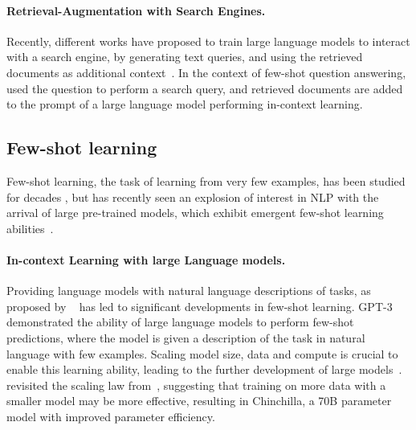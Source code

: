 \documentclass[10pt]{article} \usepackage[preprint]{tmlr}
\begin{document}
\paragraph{Retrieval-Augmentation with Search Engines.}
Recently, different works have proposed to train large language models to interact with a search engine, by generating text queries, and using the retrieved documents as additional context~\citep{Nakano2021WebGPTBQ,Thoppilan2022LaMDALM,Shuster2022LanguageMT}.
In the context of few-shot question answering, \citet{Lazaridou2022InternetaugmentedLM} used the question to perform a search query, and retrieved documents are added to the prompt of a large language model performing in-context learning.

\subsection{Few-shot learning}
Few-shot learning, the task of learning from very few examples, has been studied for decades \citep{thrun_learning,fink_object,matchingnetworks}, but has recently seen an explosion of interest in NLP with the arrival of large pre-trained models, which exhibit emergent few-shot learning abilities~\citep{wei2022emergent}.

\paragraph{In-context Learning with large Language models.}
Providing language models with natural language descriptions of tasks, as proposed by ~\citet{radford2019language} has led to significant developments in few-shot learning.
GPT-3~\citep{brown2020gpt3} demonstrated the ability of large language models to perform few-shot predictions, where the model is given a description of the task in natural language with few examples.
Scaling model size, data and compute is crucial to enable this learning ability, leading to the further development of large models~\citep{lieber2021j1, rae2021goepher, smith2022megatron, chowdhery2022palm, smith2022megatron}.
\citet{hoffmann2022chinchilla} revisited the scaling law from~\citet{kaplan2020scaling}, suggesting that training on more data with a smaller model may be more effective, resulting in Chinchilla, a 70B parameter model with improved parameter efficiency.
\end{document}
